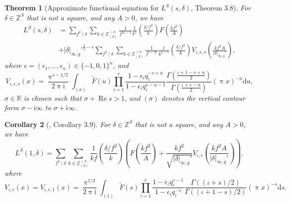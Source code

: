 \documentclass[10pt,oneside,reqno]{amsart}
\newcommand\rmd{\mathrm{d}}
\newcommand\rmi{\mathrm{i}}
\newcommand\RR{\mathbb{R}}
\newcommand\ZZ{\mathbb{Z}}
\renewcommand\Re{\mathop{\mathrm{Re}}}
\newcommand\legendresymbol[2]{\genfrac{(}{)}{}{}{#1}{#2}}
\theoremstyle{THEOREM}
\newtheorem{theorem}{Theorem}[section]
\newtheorem{corollary}[theorem]{Corollary}
\theoremstyle{DEFINITION}
\theoremstyle{EXERCISE}
\numberwithin{equation}{section}
\begin{document}
\begin{theorem}[Approximate functional equation for $L^{S}(s,\delta)$, \cite{cheng2025} Theorem 3.8]\label{thm:afe}
For $\delta\in \ZZ^S$ that is not a square, and any $A>0$, we have
\begin{equation}\label{eq:approximatefe}
\begin{split}
   L^{S}(s,\delta) & =\sum_{f^2\mid \delta}\sum_{k\in \ZZ_{(S)}^{>0}}\frac{1}{f^{2s-1}}\frac{1}{k^s}\legendresymbol{\delta/f^2}{k}F\legendresymbol{kf^2}{A}\\
     & +|\delta|_{\infty,q}'^{\frac12-s}\sum_{f^2\mid \delta}\sum_{k\in \ZZ_{(S)}^{>0}}\frac{1}{f^{1-2s}}\frac{1}{k^{1-s}}\legendresymbol{\delta/f^2}{k}V_{\iota,\epsilon,s}\legendresymbol{kf^2A}{|\delta|_{\infty,q}'},
\end{split}
\end{equation}
where $\epsilon=(\epsilon_1,\dots,\epsilon_n)\in \{-1,0,1\}^n$, and
\[
V_{\iota,\epsilon,s}(x)=\frac{\uppi^{s-1/2}}{2\uppi \rmi}\int_{(\sigma)}\widetilde{F}(u)\prod_{i=1}^{r}\frac{1-\epsilon_iq_i^{-s+u}}{1-\epsilon_iq_i^{s-u-1}}\frac{\Gamma(\frac{\iota+1-s+u}{2})}{\Gamma(\frac{\iota+s-u}{2})}(\uppi x)^{-u}\rmd u,
\]
$\sigma\in \RR$ is chosen such that $\sigma+\Re s>1$, and $(\sigma)$ denotes the vertical contour form $\sigma-\rmi\infty$ to $\sigma+\rmi\infty$.
\end{theorem}
\begin{corollary}[\cite{cheng2025}, Corollary 3.9]\label{cor:afe1}
For $\delta\in \ZZ^S$ that is not a square, and any $A>0$, we have
\begin{equation}\label{eq:approximatefeat1}
L^{S}(1,\delta)=\sum_{f^2\mid \delta}\sum_{k\in \ZZ_{(S)}^{>0}}\frac{1}{kf}\legendresymbol{\delta/f^2}{k}\left(F\legendresymbol{kf^2}{A}+\frac{kf^2}{\sqrt{|\delta|_{\infty,q}'}}V_{\iota,\epsilon}\legendresymbol{kf^2A}{|\delta|_{\infty,q}'}\right),
\end{equation}
where 
\[
V_{\iota,\epsilon}(x)=V_{\iota,\epsilon,1}(x)=\frac{\uppi^{1/2}}{2\uppi \rmi}\int_{(1)}\widetilde{F}(s)\prod_{i=1}^{r}\frac{1-\epsilon_i q_i^{s-1}}{1-\epsilon_i q_i^{-s}}\frac{\Gamma((\iota+s)/2)}{\Gamma((\iota+1-s)/2)}(\uppi x)^{-s}\rmd s.
\]
\end{corollary}
\end{document}
